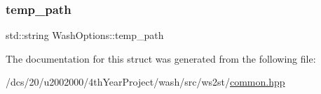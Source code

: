\mbox{\label{structWashOptions_a27f59d7e66cdf80f0fe5cc5e699b0953}} 
\subsubsection{\texorpdfstring{temp\+\_\+path}{temp\_path}}
{\footnotesize\ttfamily std\+::string Wash\+Options\+::temp\+\_\+path}



The documentation for this struct was generated from the following file\+:\begin{DoxyCompactItemize}
\item 
/dcs/20/u2002000/4th\+Year\+Project/wash/src/ws2st/\mbox{\hyperlink{common_8hpp}{common.\+hpp}}\end{DoxyCompactItemize}
